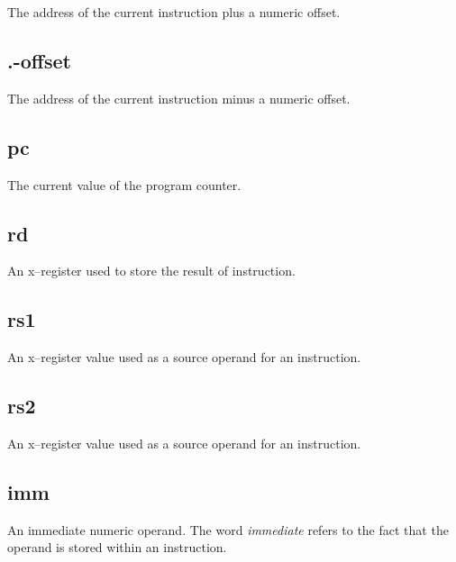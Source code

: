 The address of the current instruction plus a numeric offset.

\subsection{.-offset}

The address of the current instruction minus a numeric offset.

\subsection{pc}

The current value of the program counter.

\subsection{rd}

An x--register used to store the result of instruction.

\subsection{rs1}

An x--register value used as a source operand for an instruction.

\subsection{rs2}

An x--register value used as a source operand for an instruction.

\subsection{imm}

An immediate numeric operand.  The word {\em immediate} refers
to the fact that the operand is stored within an instruction.


